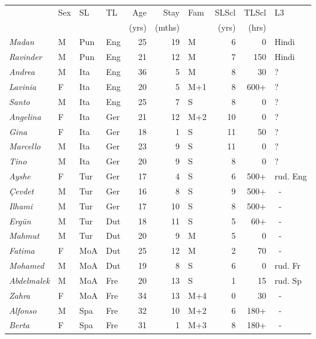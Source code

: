 \documentclass[output=paper]{langscibook}
\begin{document}
\begin{table}
\small
\begin{tabularx}{\textwidth}{llllrrlrrQ}
\lsptoprule
&  Sex &  SL &  TL & {Age} & {Stay} &  Fam & {SLScl} &  TLScl  & L3\\
&      &     &     & (yrs) & (mths) &    &  (yrs) & (hrs) &\\\midrule
{\itshape Madan} &  M &  Pun &  Eng &  25 &  19 & M &  6 &  0 & Hindi\\
{\itshape Ravinder} &  M &  Pun &  Eng &  21 &  12 & M &  7 &  150 & Hindi\\
{\itshape Andrea} &  M &  Ita &  Eng &  36 &  5 & M &  8 &  30 & ?\\
{\itshape Lavinia} &  F &  Ita &  Eng &  20 &  5 & M+1 &  8 &  600+ & ?\\
{\itshape Santo} &  M &  Ita &  Eng &  25 &  7 & S &  8 &  0 & ?\\
{\itshape Angelina} &  F &  Ita &  Ger &  21 &  12 & M+2 &  10 &  0 & ?\\
{\itshape Gina} &  F &  Ita &  Ger &  18 &  1 & S &  11 &  50 & ?\\
{\itshape Marcello} &  M &  Ita &  Ger &  23 &  9 & S &  11 &  0 & ?\\
{\itshape Tino} &  M &  Ita &  Ger &  20 &  9 & S &  8 &  0 & ?\\
{\itshape Ayshe} &  F &  Tur &  Ger &  17 &  4 & S &  6 &  500+ & rud. Eng\\
{\itshape Çevdet} &  M &  Tur &  Ger &  16 &  8 & S &  9 &  500+ & ~-\\
{\itshape Ilhami} &  M &  Tur &  Ger &  17 &  10 & S &  8 &  500+ & ~-\\
{\itshape Ergün} &  M &  Tur &  Dut &  18 &  11 & S &  5 &  60+ & ~-\\
{\itshape Mahmut} &  M &  Tur &  Dut &  20 &  9 & M &  5 &  0 & ~-\\
{\itshape Fatima} &  F &  MoA &  Dut &  25 &  12 & M &  2 &  70 & ~-\\
{\itshape Mohamed} &  M &  MoA &  Dut &  19 &  8 & S &  6 &  0 & rud. Fr\\
{\itshape Abdelmalek} &  M &  MoA &  Fre &  20 &  13 & S &  1 &  15 & rud. Sp\\
{\itshape Zahra} &  F &  MoA &  Fre &  34 &  13 & M+4 &  0 &  30 & ~-\\
{\itshape Alfonso}  &  M &  Spa &  Fre &  32 &  10 & M+2 &  6 &  180+ & ~-\\
{\itshape Berta}  &  F &  Spa &  Fre &  31 &  1 & M+3 &  8 &  180+ & ~-\\

\end{tabularx}
\end{table}
\end{document}
